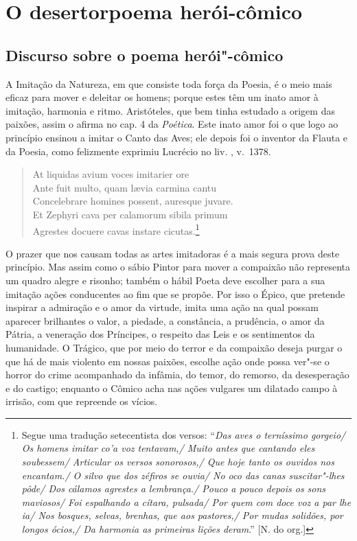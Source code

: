 \part[O desertor: poema herói-cômico]{O desertor\break poema herói-cômico} 

\chapter{Discurso sobre o poema herói"-cômico}

A Imitação da Natureza, em que consiste toda força da Poesia, 				\index{\Iminat}
é o meio mais eficaz para mover e deleitar os homens; 					\index{\Util}
porque estes têm um inato amor à imitação, harmonia e ritmo.
Aristóteles, que bem tinha estudado a origem das paixões, assim o afirma no 
cap. 4 da \textit{Poética}. 							\index{\Arist}
Este inato amor foi o que logo ao princípio ensinou a imitar o Canto das Aves; ele 
depois foi o inventor da Flauta e da Poesia, como felizmente exprimiu Lucrécio
no liv. , v.~1378.								\index{\Lucre} \index{\Poet}


\begin{verse}
At liquidas avium voces imitarier ore \\
Ante fuit multo, quam l\ae via carmina cantu \\
Concelebrare homines possent, auresque juvare. \\
Et Zephyri cava per calamorum sibila primum \\
Agrestes docuere cavas instare cicutas.\footnote{ Segue uma tradução
setecentista dos versos: ``\textit{Das aves o terníssimo gorgeio/ Os homens
imitar co'a voz tentavam,/ Muito antes que cantando eles soubessem/ Articular
os versos sonorosos,/ Que hoje tanto os ouvidos nos encantam./ O silvo que dos
zéfiros se ouvia/ No oco das canas suscitar"-lhes pôde/ Dos cálamos agrestes a 
lembrança./ Pouco a pouco depois os sons maviosos/ Foi espalhando a cítara,
pulsada/ Por quem com doce voz a par lhe ia/ Nos bosques, selvas, brenhas, que
aos pastores,/ Por mudas solidões, por longos ócios,/ Da harmonia as primeiras
lições deram}.'' \cite[p. 172]{lucrecio} [N. do org.] }\\[10pt] 				\index{\Zefir}
\end{verse}

O prazer que nos causam todas as artes imitadoras
é a mais segura prova deste princípio. Mas assim 
como o sábio Pintor para mover a compaixão não 						%
representa um quadro alegre e risonho; também o hábil 
Poeta deve escolher para a sua imitação ações 
conducentes ao fim que se propõe. Por isso o Épico, 					\index{\Epico}
que pretende inspirar a admiração e o amor da virtude, 
imita uma ação na qual possam aparecer brilhantes o valor,
a piedade, a constância, a prudência, o amor da Pátria, 
a veneração dos Príncipes, o respeito das Leis e os 
sentimentos da humanidade. O Trágico, que por meio do terror 				\index{\Trag}
e da compaixão deseja purgar o que há de mais violento em  
nossas paixões, escolhe ação onde possa ver"-se o horror 
do crime acompanhado da infâmia, do temor, do remorso, da desesperação 
e do castigo; enquanto o Cômico acha nas ações vulgares 				\index{\Comic}
um dilatado campo à irrisão, com que repreende os vícios.

